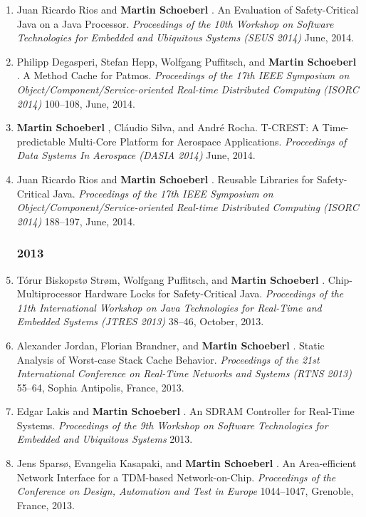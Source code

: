 \begin{enumerate}
\item Juan Ricardo Rios and {\bf Martin Schoeberl }.
 An Evaluation of Safety-Critical Java on a Java Processor.
 \emph{Proceedings of the 10th Workshop on Software Technologies for Embedded and Ubiquitous Systems (SEUS 2014)} June, 2014.

\item Philipp Degasperi, Stefan Hepp, Wolfgang Puffitsch, and {\bf Martin Schoeberl }.
 A Method Cache for Patmos.
 \emph{Proceedings of the 17th IEEE Symposium on Object/Component/Service-oriented Real-time Distributed Computing (ISORC 2014)} 100--108, June, 2014.

\item {\bf Martin Schoeberl }, Cl\'{a}udio Silva, and Andr\'{e} Rocha.
 T-CREST: A Time-predictable Multi-Core Platform for Aerospace Applications.
 \emph{Proceedings of Data Systems In Aerospace (DASIA 2014)} June, 2014.

\item Juan Ricardo Rios and {\bf Martin Schoeberl }.
 Reusable Libraries for Safety-Critical Java.
 \emph{Proceedings of the 17th IEEE Symposium on Object/Component/Service-oriented Real-time Distributed Computing (ISORC 2014)} 188--197, June, 2014.


\subsubsection*{2013}

\item T{\'o}rur Biskopst{\o} Str{\o}m, Wolfgang Puffitsch, and {\bf Martin Schoeberl }.
 Chip-Multiprocessor Hardware Locks for Safety-Critical Java.
 \emph{Proceedings of the 11th International Workshop on Java Technologies for Real-Time and Embedded Systems (JTRES 2013)} 38--46, October, 2013.

\item Alexander Jordan, Florian Brandner, and {\bf Martin Schoeberl }.
 Static Analysis of Worst-case Stack Cache Behavior.
 \emph{Proceedings of the 21st International Conference on Real-Time Networks and Systems (RTNS 2013)} 55--64, Sophia Antipolis, France, 2013.

\item Edgar Lakis and {\bf Martin Schoeberl }.
 An SDRAM Controller for Real-Time Systems.
 \emph{Proceedings of the 9th Workshop on Software Technologies for Embedded and Ubiquitous Systems} 2013.

\item Jens Spars{\o}, Evangelia Kasapaki, and {\bf Martin Schoeberl }.
 An Area-efficient Network Interface for a TDM-based Network-on-Chip.
 \emph{Proceedings of the Conference on Design, Automation and Test in Europe} 1044--1047, Grenoble, France, 2013.


\end{enumerate}
